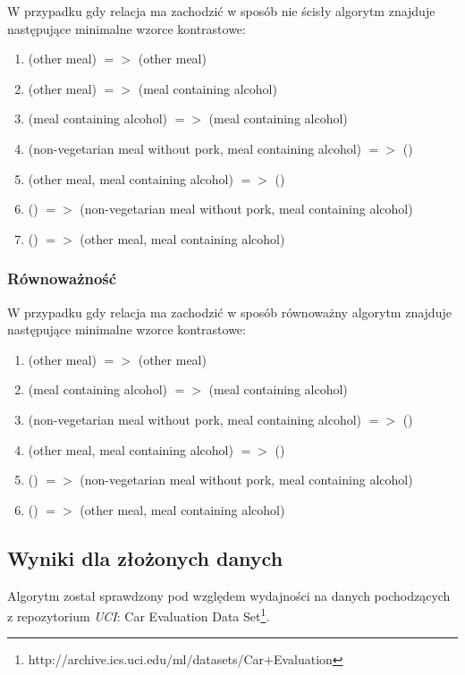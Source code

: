 \documentclass[a4paper,12pt]{article}
\begin{document}
W przypadku gdy relacja ma zachodzić w sposób nie ścisły algorytm znajduje następujące minimalne wzorce kontrastowe:

\begin{enumerate}
\item (other meal) $=>$ (other meal)
\item (other meal) $=>$ (meal containing alcohol)
\item (meal containing alcohol) $=>$ (meal containing alcohol)
\item (non-vegetarian meal without pork, meal containing alcohol) $=>$ ()
\item (other meal, meal containing alcohol) $=>$ ()
\item () $=>$ (non-vegetarian meal without pork, meal containing alcohol)
\item () $=>$ (other meal, meal containing alcohol)
\end{enumerate}

\subsubsection{Równoważność}

W przypadku gdy relacja ma zachodzić w sposób równoważny algorytm znajduje następujące minimalne wzorce kontrastowe:

\begin{enumerate}
\item (other meal) $=>$ (other meal)
\item (meal containing alcohol) $=>$ (meal containing alcohol)
\item (non-vegetarian meal without pork, meal containing alcohol) $=>$ ()
\item (other meal, meal containing alcohol) $=>$ ()
\item () $=>$ (non-vegetarian meal without pork, meal containing alcohol)
\item () $=>$ (other meal, meal containing alcohol)
\end{enumerate}

\subsection{Wyniki dla złożonych danych}

Algorytm został sprawdzony pod względem wydajności na danych pochodzących z repozytorium \textit{UCI}: Car Evaluation Data Set\footnote{http://archive.ics.uci.edu/ml/datasets/Car+Evaluation}.\\
\end{document}
